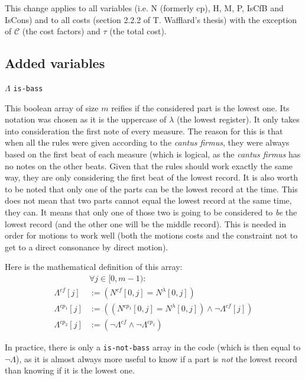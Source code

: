 This change applies to all variables (i.e. N (formerly cp), H, M, P, IsCfB and IsCons) and to all costs (section 2.2.2 of T. Wafflard's thesis) with the exception of $\mathcal{C}$ (the cost factors) and $\tau$ (the total cost).

\subsection{Added variables}
\vspace{.5cm} \noindent \textbf{$\Lambda$} \hspace{.cm} \texttt{is-bass} \label{is-bass}

This boolean array of size $m$ reifies if the considered part is the lowest one. Its notation was chosen as it is the uppercase of $\lambda$ (the lowest register). It only takes into consideration the first note of every measure. The reason for this is that when all the rules were given according to the \textit{cantus firmus}, they were always based on the first beat of each measure (which is logical, as the \textit{cantus firmus} has no notes on the other beats. Given that the rules should work exactly the same way, they are only considering the first beat of the lowest record.
It is also worth to be noted that only one of the parts can be the lowest record at the time. This does not mean that two parts cannot equal the lowest record at the same time, they can. It means that only one of those two is going to be considered to \textit{be} the lowest record (and the other one will be the middle record). This is needed in order for motions to work well (both the motions costs and the constraint not to get to a direct consonance by direct motion).

Here is the mathematical definition of this array:
\begin{equation}
\begin{aligned}
&\forall j \in [0, m-1) \colon  \\
\Lambda^{cf}[j] &:= (N^{cf}[0,j] = N^\lambda[0,j])\\
\Lambda^{cp_1}[j] &:= ((N^{cp_1}[0,j] = N^\lambda[0,j]) \land \neg \Lambda^{cf}[j])\\
\Lambda^{cp_2}[j] &:= (\neg \Lambda^{cf} \land \neg \Lambda^{cp_1})
\end{aligned}
\end{equation}

In practice, there is only a \texttt{is-not-bass} array in the code (which is then equal to $\neg \Lambda$), as it is almost always more useful to know if a part is \textit{not} the lowest record than knowing if it is the lowest one. 


